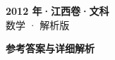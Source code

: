 \documentclass[zihao=-4, a4paper]{ctexart}
\begin{document}
\begin{center}
  {\Large\bfseries 2012 年·江西卷·文科}\\[4pt]
  {\large 数学 · 解析版}
\end{center}
\medskip
{}

\clearpage
{}
\begin{center}{\Large\bfseries 参考答案与详细解析}\end{center}
\medskip

\end{document}
